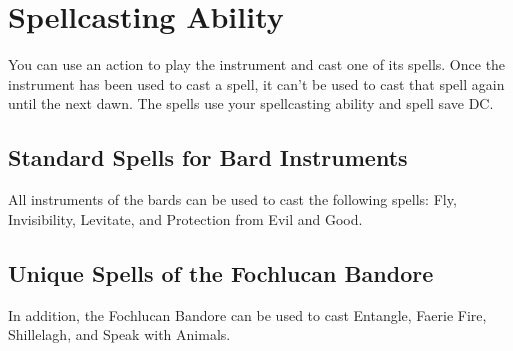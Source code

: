 \documentclass[letterpaper,openany,oneside,twocolumn]{book}
\begin{document}
\section*{Spellcasting Ability}
You can use an action to play the instrument and cast one of its spells. Once the instrument has been used to cast a spell, it can't be used to cast that spell again until the next dawn. The spells use your spellcasting ability and spell save DC.
\subsection*{Standard Spells for Bard Instruments}
All instruments of the bards can be used to cast the following spells: Fly, Invisibility, Levitate, and Protection from Evil and Good.
\subsection*{Unique Spells of the Fochlucan Bandore}
In addition, the Fochlucan Bandore can be used to cast Entangle, Faerie Fire, Shillelagh, and Speak with Animals.
\end{document}
